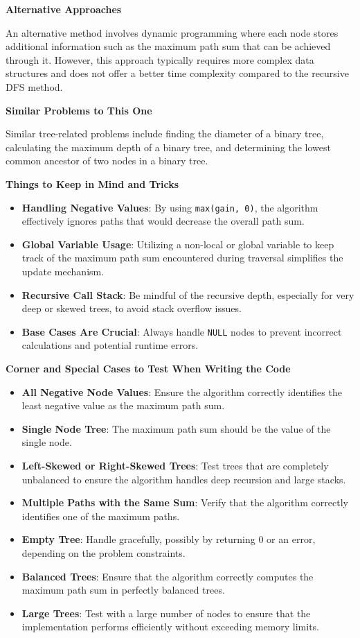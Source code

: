 \textbf{Alternative Approaches}

An alternative method involves dynamic programming where each node stores additional information such as the maximum path sum that can be achieved through it. However, this approach typically requires more complex data structures and does not offer a better time complexity compared to the recursive DFS method.

\textbf{Similar Problems to This One}

Similar tree-related problems include finding the diameter of a binary tree, calculating the maximum depth of a binary tree, and determining the lowest common ancestor of two nodes in a binary tree.

\textbf{Things to Keep in Mind and Tricks}

\begin{itemize}
    \item \textbf{Handling Negative Values}: By using \texttt{max(gain, 0)}, the algorithm effectively ignores paths that would decrease the overall path sum.
    \item \textbf{Global Variable Usage}: Utilizing a non-local or global variable to keep track of the maximum path sum encountered during traversal simplifies the update mechanism.
    \item \textbf{Recursive Call Stack}: Be mindful of the recursive depth, especially for very deep or skewed trees, to avoid stack overflow issues.
    \item \textbf{Base Cases Are Crucial}: Always handle \texttt{NULL} nodes to prevent incorrect calculations and potential runtime errors.
\end{itemize}

\textbf{Corner and Special Cases to Test When Writing the Code}

\begin{itemize}
    \item \textbf{All Negative Node Values}: Ensure the algorithm correctly identifies the least negative value as the maximum path sum.
    \item \textbf{Single Node Tree}: The maximum path sum should be the value of the single node.
    \item \textbf{Left-Skewed or Right-Skewed Trees}: Test trees that are completely unbalanced to ensure the algorithm handles deep recursion and large stacks.
    \item \textbf{Multiple Paths with the Same Sum}: Verify that the algorithm correctly identifies one of the maximum paths.
    \item \textbf{Empty Tree}: Handle gracefully, possibly by returning 0 or an error, depending on the problem constraints.
    \item \textbf{Balanced Trees}: Ensure that the algorithm correctly computes the maximum path sum in perfectly balanced trees.
    \item \textbf{Large Trees}: Test with a large number of nodes to ensure that the implementation performs efficiently without exceeding memory limits.
\end{itemize}